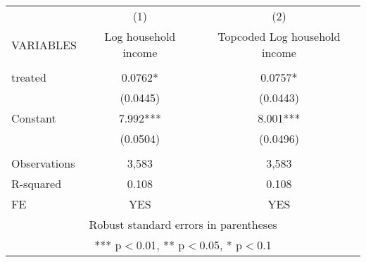 \documentclass[]{article}
\begin{document}
\begin{tabular}{lcc} \hline
 & (1) & (2) \\
VARIABLES & Log household income & Topcoded Log household income \\ \hline
 &  &  \\
treated & 0.0762* & 0.0757* \\
 & (0.0445) & (0.0443) \\
Constant & 7.992*** & 8.001*** \\
 & (0.0504) & (0.0496) \\
 &  &  \\
Observations & 3,583 & 3,583 \\
R-squared & 0.108 & 0.108 \\
 FE & YES & YES \\ \hline
\multicolumn{3}{c}{ Robust standard errors in parentheses} \\
\multicolumn{3}{c}{ *** p$<$0.01, ** p$<$0.05, * p$<$0.1} \\
\end{tabular}
\end{document}
